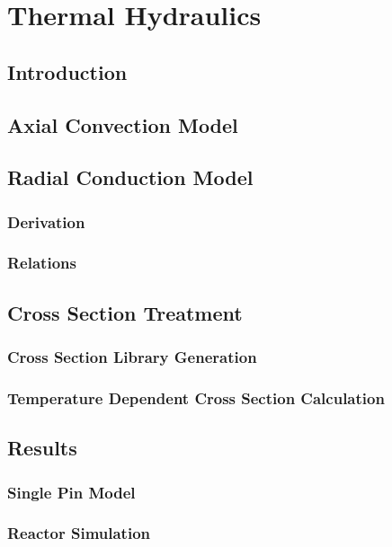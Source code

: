 \chapter{Thermal Hydraulics}
\label{ch:thermalHydraulics}

\section{Introduction}
\section{Axial Convection Model}
\section{Radial Conduction Model}
  \subsection{Derivation}
  \subsection{Relations}
\section{Cross Section Treatment}
  \subsection{Cross Section Library Generation}
  \subsection{Temperature Dependent Cross Section Calculation}
\section{Results}
  \subsection{Single Pin Model}
  \subsection{Reactor Simulation}
